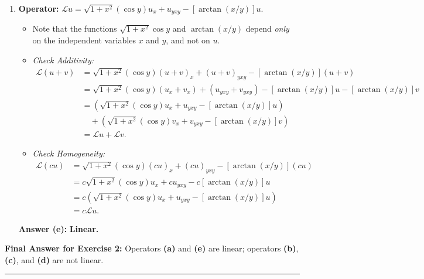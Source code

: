 \documentclass[11pt,a4paper]{article}
\begin{document}
\begin{enumerate}[label=(\alph*)]
    \item \textbf{Operator:} $\mathcal{L}u = \sqrt{1 + x^2}(\cos y)u_x + u_{yxy} - [\arctan(x/y)]u$.
    \begin{itemize}
        \item Note that the functions $\sqrt{1 + x^2}\cos y$ and $\arctan(x/y)$ depend \emph{only} on the independent variables $x$ and $y$, and not on $u$.
        \item \emph{Check Additivity:}
        \begin{align*}
            \mathcal{L}(u + v) &= \sqrt{1 + x^2}(\cos y)(u + v)_x + (u + v)_{yxy} - [\arctan(x/y)](u + v) \\
            &= \sqrt{1 + x^2}(\cos y)(u_x + v_x) + (u_{yxy} + v_{yxy}) - [\arctan(x/y)]u - [\arctan(x/y)]v \\
            &= \left(\sqrt{1 + x^2}(\cos y)u_x + u_{yxy} - [\arctan(x/y)]u\right) \\
            &\quad + \left(\sqrt{1 + x^2}(\cos y)v_x + v_{yxy} - [\arctan(x/y)]v\right) \\
            &= \mathcal{L}u + \mathcal{L}v.
        \end{align*}
        \item \emph{Check Homogeneity:}
        \begin{align*}
            \mathcal{L}(cu) &= \sqrt{1 + x^2}(\cos y)(cu)_x + (cu)_{yxy} - [\arctan(x/y)](cu) \\
            &= c\sqrt{1 + x^2}(\cos y)u_x + c u_{yxy} - c[\arctan(x/y)]u \\
            &= c\left(\sqrt{1 + x^2}(\cos y)u_x + u_{yxy} - [\arctan(x/y)]u\right) \\
            &= c\mathcal{L}u.
        \end{align*}
    \end{itemize}
    \textbf{Answer (e):} \textbf{Linear.}
\end{enumerate}

\textbf{Final Answer for Exercise 2:} Operators \textbf{(a)} and \textbf{(e)} are linear; operators \textbf{(b)}, \textbf{(c)}, and \textbf{(d)} are not linear.

\bigskip
\hrule
\bigskip
\end{document}
